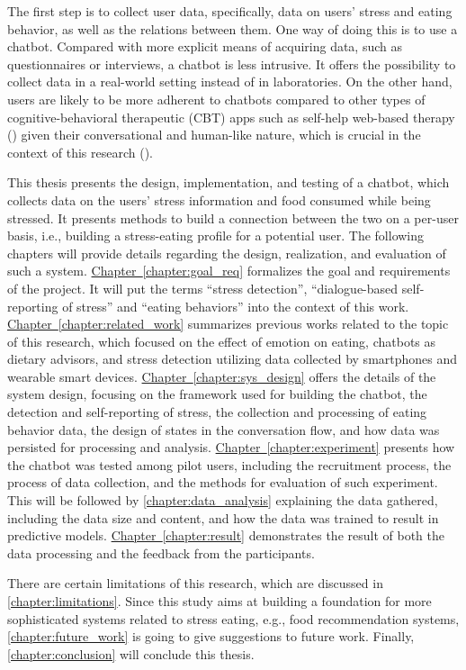 \noindent The first step is to collect user data, specifically, data on users’ stress and eating behavior, as well as the relations between them. One way of doing this is to use a chatbot. Compared with more explicit means of acquiring data, such as questionnaires or interviews, a chatbot is less intrusive. It offers the possibility to collect data in a real-world setting instead of in laboratories. On the other hand, users are likely to be more adherent to chatbots compared to other types of cognitive-behavioral therapeutic (CBT) apps such as self-help web-based therapy (\cite{6_cbt}) given their conversational and human-like nature, which is crucial in the context of this research (\cite{3_woebot}).

This thesis presents the design, implementation, and testing of a chatbot, which collects data on the users’ stress information and food consumed while being stressed. It presents methods to build a connection between the two on a per-user basis, i.e., building a stress-eating profile for a potential user. The following chapters will provide details regarding the design, realization, and evaluation of such a system. \hyperref[chapter:goal_req]{Chapter~\ref*{chapter:goal_req}} formalizes the goal and requirements of the project. It will put the terms “stress detection”, “dialogue-based self-reporting of stress” and “eating behaviors” into the context of this work. \hyperref[chapter:related_work]{Chapter~\ref*{chapter:related_work}} summarizes previous works related to the topic of this research, which focused on the effect of emotion on eating, chatbots as dietary advisors, and stress detection utilizing data collected by smartphones and wearable smart devices. \hyperref[chapter:sys_design]{Chapter~\ref*{chapter:sys_design}} offers the details of the system design, focusing on the framework used for building the chatbot, the detection and self-reporting of stress, the collection and processing of eating behavior data, the design of states in the conversation flow, and how data was persisted for processing and analysis. \hyperref[chapter:experiment]{Chapter~\ref*{chapter:experiment}} presents how the chatbot was tested among pilot users, including the recruitment process, the process of data collection, and the methods for evaluation of such experiment. This will be followed by \autoref{chapter:data_analysis} explaining the data gathered, including the data size and content, and how the data was trained to result in predictive models. \hyperref[chapter:result]{Chapter~\ref*{chapter:result}} demonstrates the result of both the data processing and the feedback from the participants.

There are certain limitations of this research, which are discussed in \autoref{chapter:limitations}. Since this study aims at building a foundation for more sophisticated systems related to stress eating, e.g., food recommendation systems, \autoref{chapter:future_work} is going to give suggestions to future work. Finally, \autoref{chapter:conclusion} will conclude this thesis.
